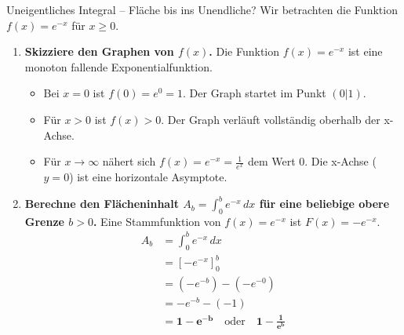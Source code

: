 \begin{loesungsumgebung}{Uneigentliches Integral – Fläche bis ins Unendliche?}
Wir betrachten die Funktion $f(x) = e^{-x}$ für $x \ge 0$.

\begin{enumerate}[label=(\alph*)]
    \item \textbf{Skizziere den Graphen von $f(x)$.}
    Die Funktion $f(x)=e^{-x}$ ist eine monoton fallende Exponentialfunktion.
    \begin{itemize}
        \item Bei $x=0$ ist $f(0)=e^0=1$. Der Graph startet im Punkt $(0|1)$.
        \item Für $x > 0$ ist $f(x) > 0$. Der Graph verläuft vollständig oberhalb der x-Achse.
        \item Für $x \to \infty$ nähert sich $f(x)=e^{-x} = \frac{1}{e^x}$ dem Wert $0$. Die x-Achse ($y=0$) ist eine horizontale Asymptote.
    \end{itemize}
    \begin{center}
    \label{fig:uneigentliches_integral_ex}
    \end{center}

    \item \textbf{Berechne den Flächeninhalt $A_b = \int_0^b e^{-x} \,dx$ für eine beliebige obere Grenze $b > 0$.}
    Eine Stammfunktion von $f(x)=e^{-x}$ ist $F(x) = -e^{-x}$.
    \begin{align*} A_b &= \int_0^b e^{-x} \,dx \\ &= [-e^{-x}]_0^b \\ &= (-e^{-b}) - (-e^{-0}) \\ &= -e^{-b} - (-1) \\ &= \mathbf{1 - e^{-b}} \quad \text{oder} \quad \mathbf{1 - \frac{1}{e^b}} \end{align*}


\end{enumerate}
\end{loesungsumgebung}
